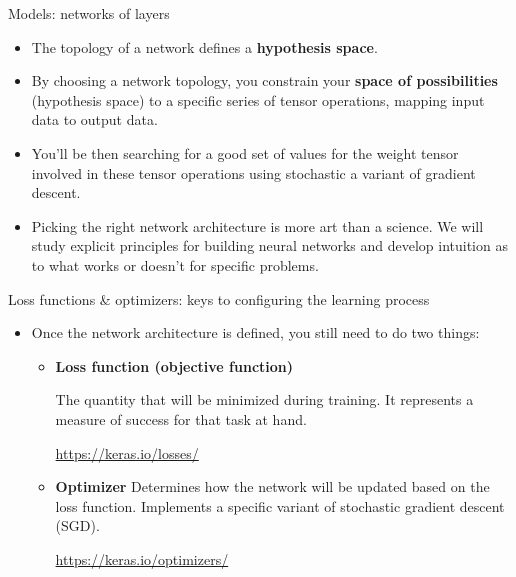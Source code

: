 \documentclass{beamer}
\begin{document}
\begin{frame}{Models: networks of layers}
\begin{itemize}
\item The topology of a network defines a \textbf{hypothesis space}. 
\item By choosing a network topology, you constrain your \textbf{space of possibilities} (hypothesis space) to a specific series of tensor operations, mapping input data to output data.
\item You'll be then searching for a good set of values for the weight tensor involved in these tensor operations using stochastic a variant of gradient descent.
\item Picking the right network architecture is more art than a science. We will study explicit principles for building neural networks and develop intuition as to what works or doesn't for specific problems.
\end{itemize}
\end{frame}


\begin{frame}{Loss functions \& optimizers: keys to configuring the learning process}
\begin{itemize}
\item Once the network architecture is defined, you still need to do two things:
\begin{itemize}

\medskip
\item \textbf{Loss function (objective function)}

The quantity that will be minimized during training. It represents a measure of success for that task at hand.

\url{https://keras.io/losses/}

\medskip
\item \textbf{Optimizer} Determines how the network will be updated based on the loss function. Implements a specific variant of stochastic gradient descent (SGD).

\url{https://keras.io/optimizers/}
\end{itemize}
\end{itemize}
\end{frame}
\end{document}
